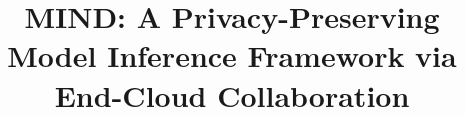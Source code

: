 ﻿\documentclass[conference]{IEEEtran}
\begin{document}
\title{MIND: A Privacy-Preserving Model Inference Framework via End-Cloud Collaboration
}

\end{document}
